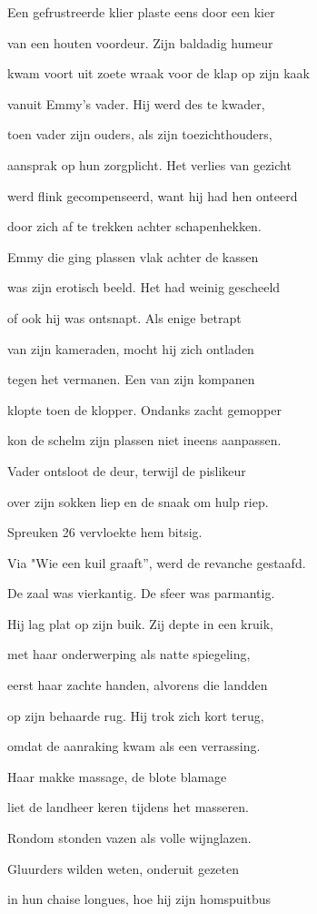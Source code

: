 Een gefrustreerde klier
plaste eens door een kier

van een houten voordeur.
Zijn baldadig humeur

kwam voort uit zoete wraak
voor de klap op zijn kaak

vanuit Emmy’s vader.
Hij werd des te kwader,

toen vader zijn ouders,
als zijn toezichthouders,

aansprak op hun zorgplicht.
Het verlies van gezicht

werd flink gecompenseerd,
want hij had hen onteerd

door zich af te trekken
achter schapenhekken.

Emmy die ging plassen
vlak achter de kassen

was zijn erotisch beeld.
Het had weinig gescheeld

of ook hij was ontsnapt.
Als enige betrapt

van zijn kameraden,
mocht hij zich ontladen

tegen het vermanen.
Een van zijn kompanen

klopte toen de klopper.
Ondanks zacht gemopper

kon de schelm zijn plassen
niet ineens aanpassen.

Vader ontsloot de deur,
terwijl de pislikeur

over zijn sokken liep
en de snaak om hulp riep.

Spreuken 26
vervloekte hem bitsig.

Via "Wie een kuil graaft”,
werd de revanche gestaafd.

De zaal was vierkantig.
De sfeer was parmantig.

Hij lag plat op zijn buik.
Zij depte in een kruik,

met haar onderwerping
als natte spiegeling,

eerst haar zachte handen,
alvorens die landden

op zijn behaarde rug.
Hij trok zich kort terug,

omdat de aanraking
kwam als een verrassing.

Haar makke massage,
de blote blamage

liet de landheer keren
tijdens het masseren.

Rondom stonden vazen
als volle wijnglazen.

Gluurders wilden weten,
onderuit gezeten

in hun chaise longues,
hoe hij zijn homspuitbus

